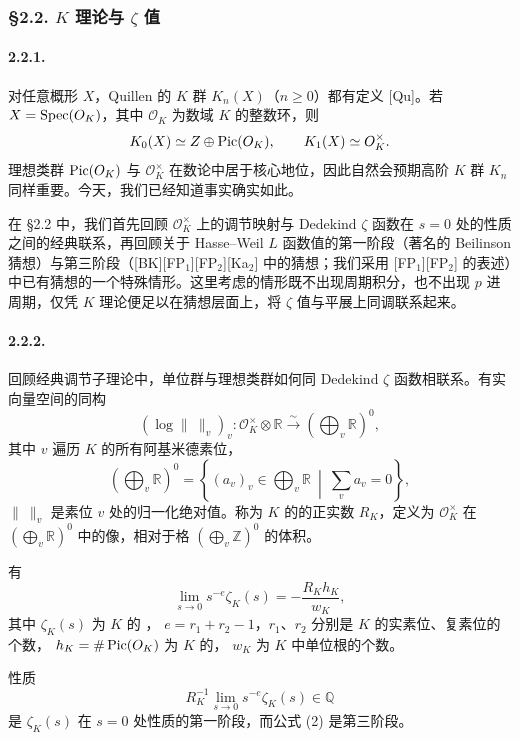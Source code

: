 \subsubsection*{§2.2. $K$ 理论与 $\zeta$ 值}
\paragraph{2.2.1.}
对任意概形 $X$，Quillen 的 $K$ 群 $K_n(X)$（$n\geq0$）都有定义 [Qu]。若
$X=\operatorname{Spec}(O_K)$，其中 $\mathcal O_K$ 为数域 $K$ 的整数环，则
\[
K_0(X)\simeq Z\oplus\operatorname{Pic}(O_K),
\qquad K_1(X)\simeq O_K^\times.
\]
理想类群 $\operatorname{Pic}(O_K)$ 与 $\mathcal O_K^\times$ 在数论中居于核心地位，因此自然会预期高阶 $K$ 群 $K_n$ 同样重要。今天，我们已经知道事实确实如此。

在 §2.2 中，我们首先回顾 $\mathcal O_K^\times$ 上的调节映射与 Dedekind $\zeta$ 函数在 $s=0$ 处的性质之间的经典联系，再回顾关于 Hasse--Weil $L$ 函数值的第一阶段（著名的 Beilinson 猜想）与第三阶段（[BK][FP$_1$][FP$_2$][Ka$_2$] 中的猜想；我们采用 [FP$_1$][FP$_2$] 的表述）中已有猜想的一个特殊情形。这里考虑的情形既不出现周期积分，也不出现 $p$ 进周期，仅凭 $K$ 理论便足以在猜想层面上，将 $\zeta$ 值与平展上同调联系起来。

\paragraph{2.2.2.}
回顾经典调节子理论中，单位群与理想类群如何同 Dedekind $\zeta$ 函数相联系。有实向量空间的同构
\[
(\log\|\ \|_v)_v\colon\mathcal O_K^\times\otimes\mathbb R
\xrightarrow{\sim}\left(\bigoplus_v\mathbb R\right)^0,\tag{1}
\]
其中 $v$ 遍历 $K$ 的所有阿基米德素位，
\[
\left(\bigoplus_v\mathbb R\right)^0
=\left\{(a_v)_v\in\bigoplus_v\mathbb R\ \middle|\ \sum_va_v=0\right\},
\]
$\|\ \|_v$ 是素位 $v$ 处的归一化绝对值。称为 $K$ 的的正实数 $R_K$，定义为
$\mathcal O_K^\times$ 在 $(\bigoplus_v\mathbb R)^0$ 中的像，相对于格
$(\bigoplus_v\mathbb Z)^0$ 的体积。

有
\[
\lim_{s\to0}s^{-e}\zeta_K(s)=-\frac{R_Kh_K}{w_K},\tag{2}
\]
其中 $\zeta_K(s)$ 为 $K$ 的 ，
$e=r_1+r_2-1$，$r_1$、$r_2$ 分别是 $K$ 的实素位、复素位的个数，
$h_K=\#\operatorname{Pic}(O_K)$ 为 $K$ 的，
$w_K$ 为 $K$ 中单位根的个数。

性质
\[
R_K^{-1}\lim_{s\to0}s^{-e}\zeta_K(s)\in\mathbb Q
\]
是 $\zeta_K(s)$ 在 $s=0$ 处性质的第一阶段，而公式 (2) 是第三阶段。

